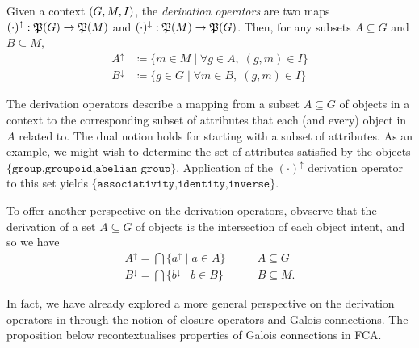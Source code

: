 \begin{definition}
   \label{definition:derivation-operators} Given a context
  $(G,M,\mathrel{I})$, the \textit{derivation operators} are two maps $(\cdot)^{\uparrow}: \mathfrak{P}({G})\to \mathfrak{P}({M})$ and $(\cdot )^{\downarrow}: \mathfrak{P}({M})\to \mathfrak{P}({G})$. Then, for any
  subsets $A \subseteq G$ and $B \subseteq M$,
  \begin{align*}
    A^{\uparrow}   & \coloneqq \{m \in M \mid \forall g \in A, \; (g,m) \in I\} \\
    B^{\downarrow} & \coloneqq \{g \in G \mid \forall m \in B, \; (g,m) \in I\}
  \end{align*}
\end{definition}

The derivation operators describe a mapping from a subset $A \subseteq G$ of objects
in a context to the corresponding subset of attributes that each (and every) object
in $A$ related to. The dual notion holds for starting with a subset of
attributes. As an example, we might wish to determine the set of attributes
satisfied by the objects $\{\texttt{group,groupoid,abelian group}\}$. Application
of the $(\cdot)^{\uparrow}$ derivation operator to this set yields $\{\texttt{associativity,identity,inverse
}\}$.

To offer another perspective on the derivation operators, obvserve that the
derivation of a set $A\subseteq G$ of objects is the intersection of each object
intent, and so we have
\begin{align*}
  A^{\uparrow}= \bigcap \{a^{\uparrow}\mid a \in A\}     & \qquad A \subseteq G  \\
  B^{\downarrow}= \bigcap \{b^{\downarrow}\mid b \in B\} & \qquad B \subseteq M.
\end{align*}

In fact, we have already explored a more general perspective on the derivation operators
in  through the notion of closure operators and Galois
connections. The proposition below recontextualises properties of Galois
connections in FCA.

